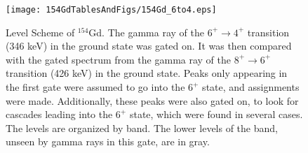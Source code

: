 \begin{landscape}
\begin{figure}
    \centering
    \texttt{[image: 154GdTablesAndFigs/154Gd\_6to4.eps]}
    \caption{Level Scheme of $^{154}$Gd. The gamma ray of the $6^+\rightarrow4^+$ transition (346 keV) in the ground state was gated on. It was then compared with the gated spectrum from the gamma ray of the $8^+\rightarrow6^+$ transition (426 keV) in the ground state. Peaks only appearing in the first gate were assumed to go into the $6^+$ state, and assignments were made. Additionally, these peaks were also gated on, to look for cascades leading into the $6^+$ state, which were found in several cases. The levels are organized by band. The lower levels of the band, unseen by gamma rays in this gate, are in gray.}
    \label{fig:154_6to4}
\end{figure}
\end{landscape}